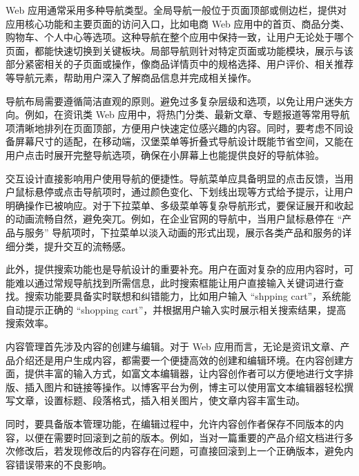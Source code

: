 

Web 应用通常采用多种导航类型。全局导航一般位于页面顶部或侧边栏，提供对应用核心功能和主要页面的访问入口，比如电商 Web 应用中的首页、商品分类、购物车、个人中心等选项。这种导航在整个应用中保持一致，让用户无论处于哪个页面，都能快速切换到关键板块。局部导航则针对特定页面或功能模块，展示与该部分紧密相关的子页面或操作，像商品详情页中的规格选择、用户评价、相关推荐等导航元素，帮助用户深入了解商品信息并完成相关操作。

导航布局需要遵循简洁直观的原则。避免过多复杂层级和选项，以免让用户迷失方向。例如，在资讯类 Web 应用中，将热门分类、最新文章、专题报道等常用导航项清晰地排列在页面顶部，方便用户快速定位感兴趣的内容。同时，要考虑不同设备屏幕尺寸的适配，在移动端，汉堡菜单等折叠式导航设计既能节省空间，又能在用户点击时展开完整导航选项，确保在小屏幕上也能提供良好的导航体验。


交互设计直接影响用户使用导航的便捷性。导航菜单应具备明显的点击反馈，当用户鼠标悬停或点击导航项时，通过颜色变化、下划线出现等方式给予提示，让用户明确操作已被响应。对于下拉菜单、多级菜单等复杂导航形式，要保证展开和收起的动画流畅自然，避免突兀。例如，在企业官网的导航中，当用户鼠标悬停在 ``产品与服务'' 导航项时，下拉菜单以淡入动画的形式出现，展示各类产品和服务的详细分类，提升交互的流畅感。

此外，提供搜索功能也是导航设计的重要补充。用户在面对复杂的应用内容时，可能难以通过常规导航找到所需信息，此时搜索框能让用户直接输入关键词进行查找。搜索功能要具备实时联想和纠错能力，比如用户输入 ``shpping cart''，系统能自动提示正确的 ``shopping cart''，并根据用户输入实时展示相关搜索结果，提高搜索效率。



内容管理首先涉及内容的创建与编辑。对于 Web 应用而言，无论是资讯文章、产品介绍还是用户生成内容，都需要一个便捷高效的创建和编辑环境。在内容创建方面，提供丰富的输入方式，如富文本编辑器，让内容创作者可以方便地进行文字排版、插入图片和链接等操作。以博客平台为例，博主可以使用富文本编辑器轻松撰写文章，设置标题、段落格式，插入相关图片，使文章内容丰富生动。

同时，要具备版本管理功能，在编辑过程中，允许内容创作者保存不同版本的内容，以便在需要时回滚到之前的版本。例如，当对一篇重要的产品介绍文档进行多次修改后，若发现修改后的内容存在问题，可直接回滚到上一个正确版本，避免内容错误带来的不良影响。

